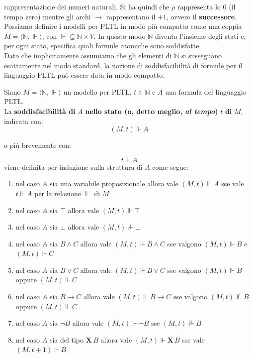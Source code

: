 \documentclass[a4paper,12pt, oneside]{book}
\begin{document}
rappresentazione dei numeri naturali. Si ha quindi che $\rho$ rappresenta lo
$0$ (il tempo zero) mentre gli archi $\to$ rappresentano il $+1$, ovvero il
\textbf{successore}.\\ 
Possiamo definire i modelli per PLTL in modo più compatto come una coppia
$M=\langle \mathbb{N},\Vdash\rangle$, con $ \Vdash \subseteq \mathbb{N}\times
V$. In questo modo $\mathbb{N}$ diventa l’insieme degli stati e, per ogni stato,
specifica quali formule atomiche sono soddisfatte. \\
Dato che implicitamente assumiamo che gli elementi di $\mathbb{N}$ si 
susseguano esattamente nel modo standard, la nozione di soddisfacibilità di
formule per il linguaggio PLTL può essere data in modo compatto.
\begin{definizione}
  Siano $M=\langle \mathbb{N},\Vdash\rangle$ un modello per PLTL, $t\in
  \mathbb{N}$ e $A$ una formula del linguaggio PLTL.\\
  La \textbf{soddisfacibilità di} $A$ \textbf{nello stato (o, detto meglio,
    \emph{al tempo})} $t$ \textbf{di} $M$, indicata con:
  \[(M,t)\Vdash A\]
  \begin{center}
    o più brevemente con:
  \end{center}
  \[t\Vdash A\]
  viene definita per induzione sulla struttura di $A$ come segue:
  \begin{enumerate}
    \item nel caso $A$ sia una variabile proposizionale allora vale
    $(M,t)\Vdash A$ sse vale $t\Vdash A$ per la relazione $\Vdash$ di $M$
    \item nel caso $A$ sia $\top$ allora vale $(M,t)\Vdash \top$
    \item nel caso $A$ sia $\bot$ allora vale $(M,t)\nVdash \bot$
    \item nel caso $A$ sia $B\land C$ allora vale $(M,t)\Vdash B\land C$ sse
    valgono $(M,t)\Vdash B$ e $(M,t)\Vdash C$
    \item nel caso $A$ sia $B\lor C$ allora vale $(M,t)\Vdash B\lor C$ sse
    valgono $(M,t)\Vdash B$ oppure $(M,t)\Vdash C$
    \item nel caso $A$ sia $B\to C$ allora vale $(M,t)\Vdash B\to C$ sse
    valgono $(M,t)\nVdash B$ oppure $(M,t)\Vdash C$
    \item nel caso $A$ sia $\neg B$ allora vale $(M,t)\Vdash \neg B$ sse
    $(M,t)\nVdash B$
    \item nel caso $A$ sia del tipo $\mathbf{X}\,B$ allora vale $(M,t)\Vdash
    \mathbf{X}\,B$ sse vale $(M,t+1)\Vdash B$

\end{enumerate}
\end{definizione}
\end{document}
